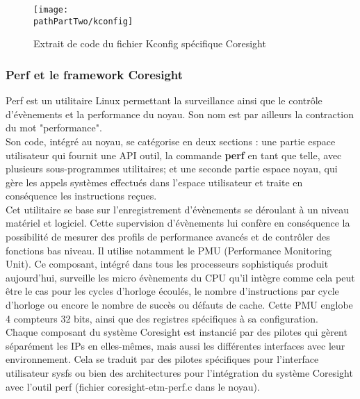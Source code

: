\begin{figure}[H]
	\begin{center}
		\texttt{[image: \\pathPartTwo/kconfig]}
		\caption{Extrait de code du fichier Kconfig spécifique Coresight}
	    \label{fig:kconfig}
	\end{center}
\end{figure}

\subsubsection{Perf et le framework Coresight}
\label{sec:perf_coresight_framework}

Perf est un utilitaire Linux permettant la surveillance ainsi que le contrôle
d'évènements et la performance du noyau. Son nom est par ailleurs la
contraction du mot "performance". \\

Son code, intégré au noyau, se catégorise en deux sections : une partie espace
utilisateur qui fournit une API outil, la commande \textbf{perf} en tant que
telle, avec plusieurs sous-programmes utilitaires; et une seconde partie
espace noyau, qui gère les appels systèmes effectués dans l'espace utilisateur
et traite en conséquence les instructions reçues. \\

Cet utilitaire se base sur l'enregistrement d'évènements se déroulant à un
niveau matériel et logiciel. Cette supervision d'évènements lui confère en
conséquence la possibilité de mesurer des profils de performance avancés et de
contrôler des fonctions bas niveau. Il utilise notamment le PMU (Performance
Monitoring Unit). Ce composant, intégré dans tous les processeurs sophistiqués
produit aujourd'hui, surveille les micro évènements du CPU qu'il intègre comme
cela peut être le cas pour les cycles d'horloge écoulés, le nombre
d'instructions par cycle d'horloge ou encore le nombre de succès ou défauts de
cache. Cette PMU englobe 4 compteurs 32 bits, ainsi que des registres
spécifiques à sa configuration. \\

Chaque composant du système Coresight est instancié par des pilotes qui gèrent
séparément les IPs en elles-mêmes, mais aussi les différentes interfaces avec
leur environnement. Cela se traduit par des pilotes spécifiques pour
l'interface utilisateur sysfs ou bien des architectures pour l'intégration du
système Coresight avec l'outil perf (fichier coresight-etm-perf.c dans le
noyau). \\

